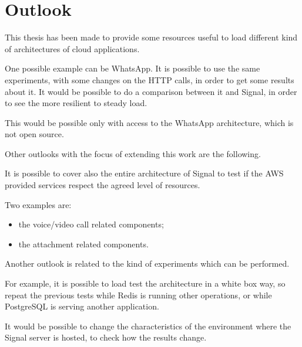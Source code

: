 \clearpage

\section{Outlook\label{sec:outlook}}

This thesis has been made to provide some resources useful to load different kind of architectures of cloud applications.

One possible example can be WhatsApp. It is possible to use the same experiments, with some changes on the HTTP calls, in order to get some results about it.
It would be possible to do a comparison between it and Signal, in order to see the more resilient to steady load.

This would be possible only with access to the WhatsApp architecture, which is not open source.

Other outlooks with the focus of extending this work are the following.

It is possible to cover also the entire architecture of Signal to test if the AWS provided services respect the agreed level of resources.

Two examples are:
\begin{itemize}
    \item the voice/video call related components;
    \item the attachment related components.
\end{itemize}

Another outlook is related to the kind of experiments which can be performed.

For example, it is possible to load test the architecture in a white box way, so repeat the previous tests while Redis is running other operations, or while PostgreSQL is serving another application.

It would be possible to change the characteristics of the environment where the Signal server is hosted, to check how the results change.